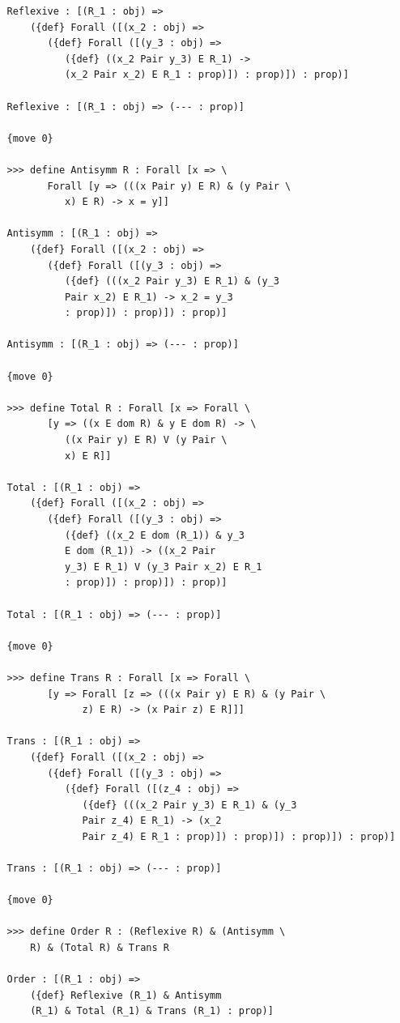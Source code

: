 \documentclass[12pt]{article}
\begin{document}
\begin{verbatim}
   Reflexive : [(R_1 : obj) => 
       ({def} Forall ([(x_2 : obj) => 
          ({def} Forall ([(y_3 : obj) => 
             ({def} ((x_2 Pair y_3) E R_1) -> 
             (x_2 Pair x_2) E R_1 : prop)]) : prop)]) : prop)]

   Reflexive : [(R_1 : obj) => (--- : prop)]

   {move 0}

   >>> define Antisymm R : Forall [x => \
          Forall [y => (((x Pair y) E R) & (y Pair \
             x) E R) -> x = y]]

   Antisymm : [(R_1 : obj) => 
       ({def} Forall ([(x_2 : obj) => 
          ({def} Forall ([(y_3 : obj) => 
             ({def} (((x_2 Pair y_3) E R_1) & (y_3 
             Pair x_2) E R_1) -> x_2 = y_3 
             : prop)]) : prop)]) : prop)]

   Antisymm : [(R_1 : obj) => (--- : prop)]

   {move 0}

   >>> define Total R : Forall [x => Forall \
          [y => ((x E dom R) & y E dom R) -> \
             ((x Pair y) E R) V (y Pair \
             x) E R]]

   Total : [(R_1 : obj) => 
       ({def} Forall ([(x_2 : obj) => 
          ({def} Forall ([(y_3 : obj) => 
             ({def} ((x_2 E dom (R_1)) & y_3 
             E dom (R_1)) -> ((x_2 Pair 
             y_3) E R_1) V (y_3 Pair x_2) E R_1 
             : prop)]) : prop)]) : prop)]

   Total : [(R_1 : obj) => (--- : prop)]

   {move 0}

   >>> define Trans R : Forall [x => Forall \
          [y => Forall [z => (((x Pair y) E R) & (y Pair \
                z) E R) -> (x Pair z) E R]]]

   Trans : [(R_1 : obj) => 
       ({def} Forall ([(x_2 : obj) => 
          ({def} Forall ([(y_3 : obj) => 
             ({def} Forall ([(z_4 : obj) => 
                ({def} (((x_2 Pair y_3) E R_1) & (y_3 
                Pair z_4) E R_1) -> (x_2 
                Pair z_4) E R_1 : prop)]) : prop)]) : prop)]) : prop)]

   Trans : [(R_1 : obj) => (--- : prop)]

   {move 0}

   >>> define Order R : (Reflexive R) & (Antisymm \
       R) & (Total R) & Trans R

   Order : [(R_1 : obj) => 
       ({def} Reflexive (R_1) & Antisymm 
       (R_1) & Total (R_1) & Trans (R_1) : prop)]


\end{verbatim}
\end{document}
